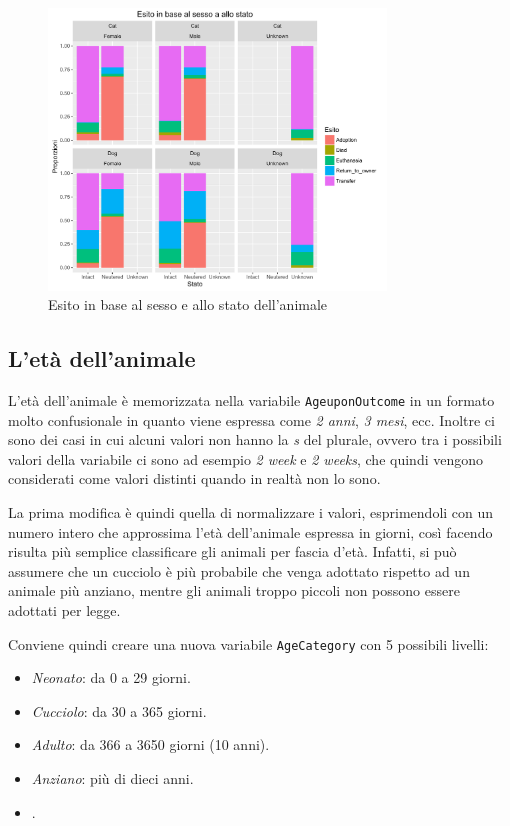 \begin{figure}[htbp]
	\centering
	\includegraphics[width=0.8\textwidth]{./grafici/esito_sesso_stato.pdf}
	\caption{Esito in base al sesso e allo stato dell'animale}\label{fig-sesso-stato}
\end{figure}

\subsection{L'età dell'animale}

L'età dell'animale è memorizzata nella variabile \texttt{AgeuponOutcome} in un formato molto confusionale in quanto viene espressa come \textit{2 anni}, \textit{3 mesi}, ecc. Inoltre ci sono dei casi in cui alcuni valori non hanno la \textit{s} del plurale, ovvero tra i possibili valori della variabile ci sono ad esempio \textit{2 week} e \textit{2 weeks}, che quindi vengono considerati come valori distinti quando in realtà non lo sono.

La prima modifica è quindi quella di normalizzare i valori, esprimendoli con un numero intero che approssima l'età dell'animale espressa in giorni, così facendo risulta più semplice classificare gli animali per fascia d'età. Infatti, si può assumere che un cucciolo è più probabile che venga adottato rispetto ad un animale più anziano, mentre gli animali troppo piccoli non possono essere adottati per legge.

Conviene quindi creare una nuova variabile \texttt{AgeCategory} con 5 possibili livelli:

\begin{itemize}
	\item \textit{Neonato}: da 0 a 29 giorni.
	\item \textit{Cucciolo}: da 30 a 365 giorni.
	\item \textit{Adulto}: da 366 a 3650 giorni (10 anni).
	\item \textit{Anziano}: più di dieci anni.
	\item {}.
\end{itemize}

